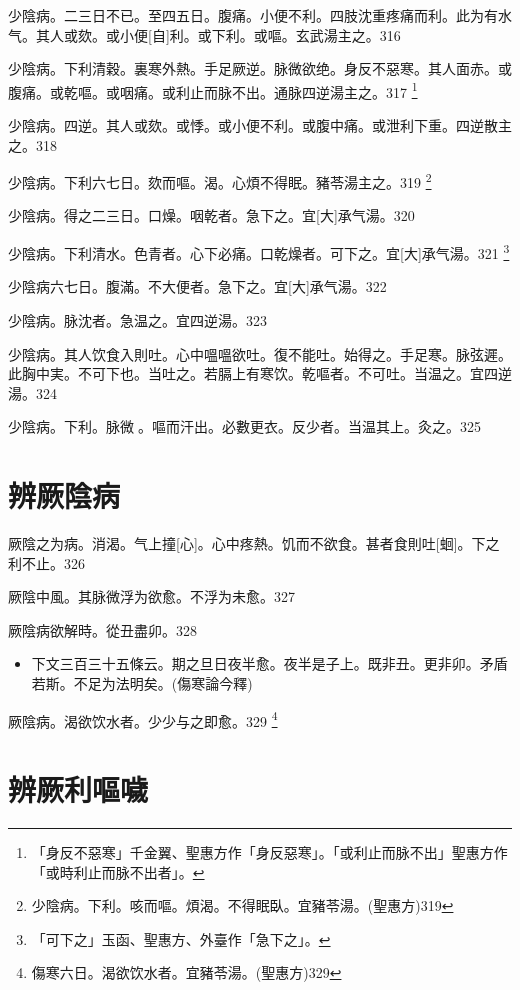 \documentclass[11pt,oneside,b5paper]{ctexbook}
\begin{document}
\begin{flushleft}
少陰病。二三日不已。至四五日。腹痛。小便不利。四肢沈重疼痛而利。此为有水气。其人或欬。或小便[自]利。或下利。或嘔。玄武湯主之。316

少陰病。下利清穀。裏寒外熱。手足厥逆。脉微欲绝。身反不惡寒。其人面赤。或腹痛。或乾嘔。或咽痛。或利止而脉不出。通脉四逆湯主之。317
\footnote{「身反不惡寒」千金翼、聖惠方作「身反惡寒」。「或利止而脉不出」聖惠方作「或時利止而脉不出者」。}

少陰病。四逆。其人或欬。或悸。或小便不利。或腹中痛。或泄利下重。四逆散主之。318

少陰病。下利六七日。欬而嘔。渴。心煩不得眠。豬苓湯主之。319
\footnote{少陰病。下利。咳而嘔。煩渴。不得眠臥。宜豬苓湯。(聖惠方)319}

少陰病。得之二三日。口燥。咽乾者。急下之。宜[大]承气湯。320

少陰病。下利清水。色青者。心下必痛。口乾燥者。可下之。宜[大]承气湯。321
\footnote{「可下之」玉函、聖惠方、外臺作「急下之」。}

少陰病六七日。腹滿。不大便者。急下之。宜[大]承气湯。322

少陰病。脉沈者。急温之。宜四逆湯。323

少陰病。其人饮食入則吐。心中嗢嗢欲吐。復不能吐。始得之。手足寒。脉弦遲。此胸中実。不可下也。当吐之。若膈上有寒饮。乾嘔者。不可吐。当温之。宜四逆湯。324

少陰病。下利。脉微{𬈧}。嘔而汗出。必數更衣。反少者。当温其上。灸之。325

\chapter{辨厥陰病}

厥陰之为病。消渴。气上撞[心]。心中疼熱。饥而不欲食。甚者食則吐[蛔]。下之利不止。326

厥陰中風。其脉微浮为欲愈。不浮为未愈。327

厥陰病欲解時。從丑盡卯。328

\begin{itemize}
\item 下文三百三十五條云。期之旦日夜半愈。夜半是子上。既非丑。更非卯。矛盾若斯。不足为法明矣。(傷寒論今釋)
\end{itemize}

厥陰病。渴欲饮水者。少少与之即愈。329
\footnote{傷寒六日。渴欲饮水者。宜豬苓湯。(聖惠方)329}

\chapter{辨厥利嘔噦}


\end{flushleft}
\end{document}
